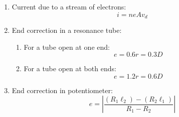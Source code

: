 \documentclass{article}
\numberwithin{equation}{section}
\numberwithin{figure}{section}
\begin{document}
\begin{enumerate}
\begin{enumerate}
		\end{enumerate}
	\item Current due to a stream of electrons:
		\begin{equation}
			i=ne A v_{d}	
		\end{equation}
	\item End correction in a resonance tube:
		\begin{enumerate}
			\item For a tube open at one end: $$e=0.6 r=0.3 D$$
			\item For a tube open at both ends: $$e=1.2 r=0.6 D$$
		\end{enumerate}
	\item End correction in potentiometer:
		\begin{equation}
		e=\left | \frac{(R_1\ell_2)-(R_2\ell_1)}{R_1-R_2}\right |
		\end{equation}
\end{enumerate}
\end{document}

